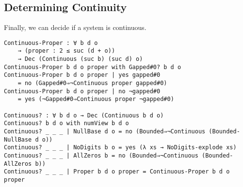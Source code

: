 \documentclass[\main/thesis.tex]{subfiles}
\begin{document}
\subsection{Determining Continuity}

Finally, we can decide if a system is continuous.

\begin{lstlisting}[basicstyle=\ttfamily\scriptsize]
Continuous-Proper : ∀ b d o
    → (proper : 2 ≤ suc (d + o))
    → Dec (Continuous (suc b) (suc d) o)
Continuous-Proper b d o proper with Gapped#0? b d o
Continuous-Proper b d o proper | yes gapped#0
    = no (Gapped#0⇒¬Continuous proper gapped#0)
Continuous-Proper b d o proper | no ¬gapped#0
    = yes (¬Gapped#0⇒Continuous proper ¬gapped#0)

Continuous? : ∀ b d o → Dec (Continuous b d o)
Continuous? b d o with numView b d o
Continuous? _ _ _ | NullBase d o = no (Bounded⇒¬Continuous (Bounded-NullBase d o))
Continuous? _ _ _ | NoDigits b o = yes (λ xs → NoDigits-explode xs)
Continuous? _ _ _ | AllZeros b = no (Bounded⇒¬Continuous (Bounded-AllZeros b))
Continuous? _ _ _ | Proper b d o proper = Continuous-Proper b d o proper
\end{lstlisting}
\end{document}
